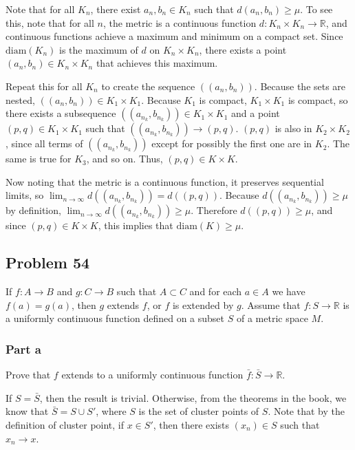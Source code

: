 \documentclass{article}
\newcommand{\R}{\mathbb{R}}
\newcommand{\diam}{\text{diam}}
\begin{document}
Note that for all $K_n$, there exist $a_n, b_n \in K_n$ such that $d(a_n, b_n) \geq \mu$. To see this, note that for all $n$, the metric is a continuous function $d: K_n \times K_n \rightarrow \R$, and continuous functions achieve a maximum and minimum on a compact set. Since $\diam(K_n)$ is the maximum of $d$ on $K_n \times K_n$, there exists a point $(a_n, b_n) \in K_n \times K_n$ that achieves this maximum.

Repeat this for all $K_n$ to create the sequence $((a_n, b_n))$. Because the sets are nested, $((a_n, b_n)) \in K_1 \times K_1$. Because $K_1$ is compact, $K_1 \times K_1$ is compact, so there exists a subsequence $((a_{n_k}, b_{n_k})) \in K_1 \times K_1$ and a point $(p, q) \in K_1 \times K_1$ such that $((a_{n_k}, b_{n_k})) \rightarrow (p, q)$. $(p, q)$ is also in $K_2 \times K_2$, since all terms of $((a_{n_k}, b_{n_k}))$ except for possibly the first one are in $K_2$. The same is true for $K_3$, and so on. Thus, $(p, q) \in K \times K$.

Now noting that the metric is a continuous function, it preserves sequential limits, so $\lim_{n \rightarrow \infty} d((a_{n_k}, b_{n_k})) = d((p, q))$. Because $d((a_{n_k}, b_{n_k})) \geq \mu$ by definition, $\lim_{n \rightarrow \infty} d((a_{n_k}, b_{n_k})) \geq \mu$. Therefore $d((p, q)) \geq \mu$, and since $(p, q) \in K \times K$, this implies that $\diam(K) \geq \mu$.

\subsection*{Problem 54}

If $f: A \rightarrow B$ and $g: C \rightarrow B$ such that $A \subset C$ and for each $a \in A$ we have $f(a) = g(a)$, then $g$ extends $f$, or $f$ is extended by $g$. Assume that $f : S \rightarrow \R$ is a uniformly continuous function defined on a subset $S$ of a metric space $M$.

\subsubsection*{Part a}

Prove that $f$ extends to a uniformly continuous function $\bar{f}: \bar{S} \rightarrow \R$.

If $S = \bar{S}$, then the result is trivial. Otherwise, from the theorems in the book, we know that $\bar{S} = S \cup S'$, where $S$ is the set of cluster points of $S$. Note that by the definition of cluster point, if $x \in S'$, then there exists $(x_n) \in S$ such that $x_n \rightarrow x$.
\end{document}
